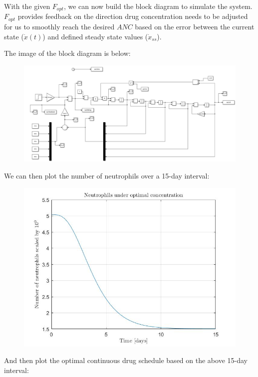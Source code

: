 \documentclass[11pt]{article}
\begin{document}
With the given $F_{opt}$, we can now build the block diagram to simulate the system. $F_{opt}$ provides feedback on the direction drug concentration needs to be adjusted for us to smoothly reach the desired $ANC$ based on the error between the current state ($\dot{x}(t)$) and defined steady state values ($\dot{x}_{ss}$).

The image of the block diagram is below:

\begin{figure}[H]
    \includegraphics[width=\textwidth]{p2blockdiagram.jpg}
\end{figure}


We can then plot the number of neutrophils over a 15-day interval:

\begin{figure}[H]
    \includegraphics[width=\textwidth]{p2image1.jpg}
\end{figure}

And then plot the optimal continuous drug schedule based on the above 15-day interval:
\end{document}
